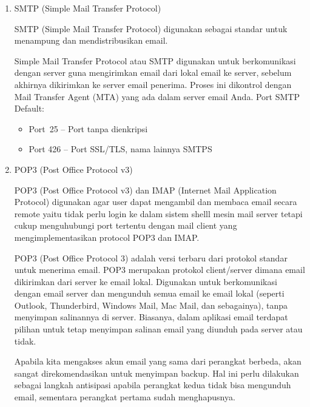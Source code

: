 \begin{enumerate}
\item SMTP (Simple Mail Transfer Protocol) \par
SMTP (Simple Mail Transfer Protocol) digunakan sebagai standar untuk menampung dan mendistribusikan email. \par
\vspace{12pt}
Simple Mail Transfer Protocol atau SMTP digunakan untuk berkomunikasi dengan server guna mengirimkan email dari lokal email ke server, sebelum akhirnya dikirimkan ke server email penerima. Proses ini dikontrol dengan Mail Transfer Agent (MTA) yang ada dalam server email Anda. Port SMTP Default: \par
\noindent 
\begin{itemize}
\item Port~25 –  Port tanpa dienkripsi \par
\noindent 
\item Port 426 – Port SSL/TLS, nama lainnya SMTPS\end{itemize}
 \par
\vspace{12pt}
\noindent 
\item POP3 (Post Office Protocol v3) \par
POP3 (Post Office Protocol v3) dan IMAP (Internet Mail Application Protocol) digunakan agar user dapat mengambil dan membaca email secara remote yaitu tidak perlu login ke dalam sistem shelll mesin mail server tetapi cukup menguhubungi port tertentu dengan mail client yang mengimplementasikan protocol POP3 dan IMAP. \par
POP3 (Post Office Protocol 3) adalah versi terbaru dari protokol standar untuk menerima email. POP3 merupakan protokol client/server dimana email dikirimkan dari server ke email lokal. Digunakan untuk berkomunikasi dengan email server dan mengunduh semua email ke email lokal (seperti Outlook, Thunderbird, Windows Mail, Mac Mail, dan sebagainya), tanpa menyimpan salinannya di server. Biasanya, dalam aplikasi email terdapat pilihan untuk tetap menyimpan salinan email yang diunduh pada server atau tidak. \par
\vspace{12pt}
Apabila kita mengakses akun email yang sama dari perangkat berbeda, akan sangat direkomendasikan untuk menyimpan backup. Hal ini perlu dilakukan sebagai langkah antisipasi apabila perangkat kedua tidak bisa mengunduh email, sementara perangkat pertama sudah menghapusnya. \par
\vspace{12pt}

\end{enumerate}
